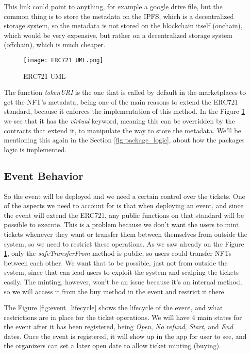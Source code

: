 This link could point to anything, for example a google drive file, but the common thing is to store the metadata on the IPFS, which is a decentralized storage system, so the metadata is not stored on the blockchain itself (onchain), which would be very expensive, but rather on a decentralized storage system (offchain), which is much cheaper.

\begin{figure}[H]
    \texttt{[image: ERC721 UML.png]}
    \centering
    \caption{ERC721 UML}
    \label{fig:erc721_uml}
\end{figure}

The function \textit{tokenURI} is the one that is called by default in the marketplaces to get the NFT's metadata, being one of the main reasons to extend the ERC721 standard, because it enforces the implementation of this method. In the Figure \ref{fig:erc721_uml} we see that it has the \textit{virtual} keyword, meaning this can be overridden by the contracts that extend it, to manipulate the way to store the metadata. We'll be mentioning this again in the Section \ref{fig:package_logic}, about how the packages logic is implemented.

\subsection{Event Behavior}
\label{subsec:event_behavior}

So the event will be deployed and we need a certain control over the tickets. One of the aspects we need to account for is that when deploying an event, and since the event will extend the ERC721, any public functions on that standard will be possible to execute. This is a problem because we don't want the users to mint tickets whenever they want or transfer them between themselves from outside the system, so we need to restrict these operations. As we saw already on the Figure \ref{fig:erc721_uml}, only the \textit{safeTransferFrom} method is public, so users could transfer NFTs between each other. We want that to be possible, just not from outside the system, since that can lead users to exploit the system and scalping the tickets easily. The minting, however, won't be an issue because it's an internal method, so we will access it from the buy method in the event and restrict it there.

The Figure \ref{fig:event_lifecycle} shows the lifecycle of the event, and what restrictions are in place for the ticket operations. We will have 4 main states for the event after it has been registered, being \textit{Open}, \textit{No refund}, \textit{Start}, and \textit{End} dates. Once the event is registered, it will show up in the app for user to see, and the organizers can set a later open date to allow ticket minting (buying).

